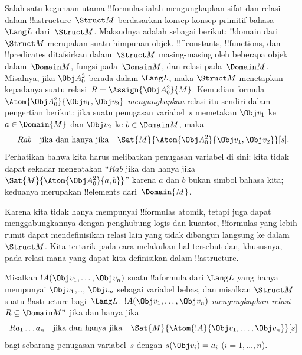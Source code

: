\documentclass[../../../include/open-logic-section]{subfiles}
\begin{document}


\begin{explain}
Salah satu kegunaan utama !!{formula}s ialah mengungkapkan sifat dan relasi
dalam !!a{structure}~$\Struct M$ berdasarkan konsep-konsep primitif bahasa
$\Lang L$ dari~$\Struct M$. Maksudnya adalah sebagai berikut: !!{domain} dari
$\Struct M$ merupakan suatu himpunan objek. !!^{constant}s, !!{function}s,
dan !!{predicate}s ditafsirkan dalam~$\Struct M$ masing-masing oleh beberapa
objek dalam~$\Domain M$, fungsi pada~$\Domain M$, dan relasi pada~$\Domain M$.
Misalnya, jika $\Obj A^2_0$ berada dalam $\Lang L$, maka $\Struct M$
menetapkan kepadanya suatu relasi~$R = \Assign{{\Obj A^2_0}}{M}$. Kemudian
formula $\Atom{\Obj A^2_0}{\Obj v_1, \Obj v_2}$ \emph{mengungkapkan} relasi
itu sendiri dalam pengertian berikut: jika suatu penugasan variabel~$s$
memetakan $\Obj v_1$ ke $a \in \Domain{M}$ dan $\Obj v_2$ ke
$b \in \Domain M$, maka
\[
Rab \text{\quad jika dan hanya jika\quad} \Sat{M}{\Atom{\Obj A^2_0}{\Obj v_1, \Obj v_2}}[s].
\]
Perhatikan bahwa kita harus melibatkan penugasan variabel di sini: kita tidak
dapat sekadar mengatakan ``$Rab$ jika dan hanya jika
$\Sat{M}{\Atom{\Obj A^2_0}{a, b}}$'' karena $a$ dan $b$ bukan simbol bahasa
kita; keduanya merupakan !!{element}s dari~$\Domain{M}$.

Karena kita tidak hanya mempunyai !!{formula}s atomik, tetapi juga dapat
menggabungkannya dengan penghubung logis dan kuantor, !!{formula}s yang lebih
rumit dapat mendefinisikan relasi lain yang tidak dibangun langsung ke
dalam~$\Struct M$. Kita tertarik pada cara melakukan hal tersebut dan,
khususnya, pada relasi mana yang dapat kita definisikan dalam !!a{structure}.
\end{explain}

\begin{defn}
Misalkan $!A(\Obj v_1,\dots, \Obj v_n)$ suatu !!a{formula} dari $\Lang L$
yang hanya mempunyai $\Obj v_1$,\dots, $\Obj v_n$ sebagai variabel bebas,
dan misalkan $\Struct M$ suatu !!a{structure} bagi~$\Lang L$.
$!A(\Obj v_1,\dots, \Obj v_n)$ \emph{mengungkapkan relasi}~$R \subseteq
\Domain M^n$ jika dan hanya jika
\[
Ra_1\dots a_n \text{\quad jika dan hanya jika\quad} \Sat{M}{\Atom{!A}{\Obj
    v_1,\dots, \Obj v_n}}[s]
\]
bagi sebarang penugasan variabel~$s$ dengan $s(\Obj v_i) = a_i$ ($i = 1,
\dots, n$).
\end{defn}
\end{document}
